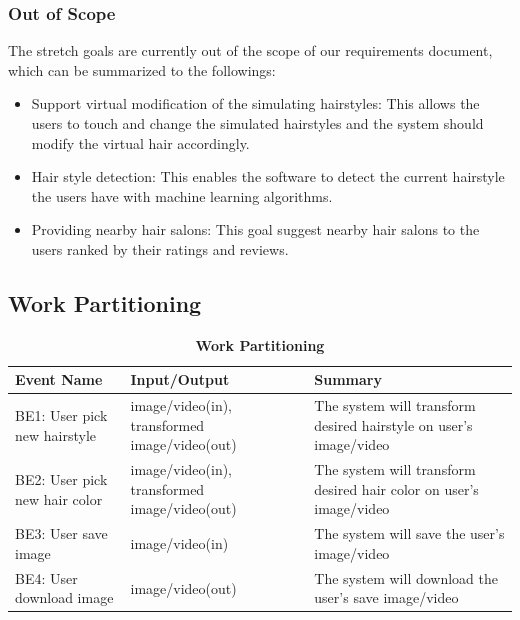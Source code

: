 \documentclass[12pt]{article}
\begin{document}
\subsubsection{Out of Scope}

The stretch goals are currently out of the scope of our requirements document, which can be summarized to the followings:

\begin{itemize}
    \item Support virtual modification of the simulating hairstyles: This allows the users to touch and change the simulated hairstyles and the system should modify the virtual hair accordingly.
    \item Hair style detection: This enables the software to detect the current hairstyle the users have with machine learning algorithms.
    \item Providing nearby hair salons: This goal suggest nearby hair salons to the users ranked by their ratings and reviews.
\end{itemize}

\subsection{Work Partitioning}
\begin{flushleft}
\begin{table}[bp hp]
\caption{\bf Work Partitioning}
    \begin{tabularx}{\linewidth}{|l|X|X|}
        \toprule {\bf Event Name} & {\bf Input/Output} & {\bf Summary}\\
        \midrule
        BE1: User pick new hairstyle & image/video(in), transformed image/video(out) & The system will transform desired hairstyle on user's image/video\\
        \hline
        BE2: User pick new hair color & image/video(in), transformed image/video(out) & The system will transform desired hair color on user's image/video\\
        \hline
        BE3: User save image & image/video(in) & The system will save the user's image/video\\
        \hline
        BE4: User download image & image/video(out) & The system will download the user's save image/video\\
        \bottomrule
    \end{tabularx}
\end{table}
\end{flushleft}
\end{document}

